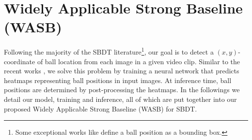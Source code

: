 \documentclass{bmvc2k}
\begin{document}
\section{Widely Applicable Strong Baseline (WASB)}
\label{sec:method}
Following the majority of the SBDT literature\footnote{Some exceptional works like \cite{zhang+2022arxiv} define a ball position as a bounding box.}, our goal is to detect a $(x,y)$-coordinate of ball location from each image in a given video clip.
Similar to the recent works \cite{komorowski+2019mva,komorowski+2019visapp,zandycke+2019mmsports,sun+2020icpai,huang+2019avss,liu+2022cvprw}, we solve this problem by training a neural network that predicts heatmaps representing ball positions in input images.
At inference time, ball positions are determined by post-processing the heatmaps.
In the followings we detail our model, training and inference, all of which are put together into our proposed Widely Applicable Strong Baseline (WASB) for SBDT.
\end{document}
